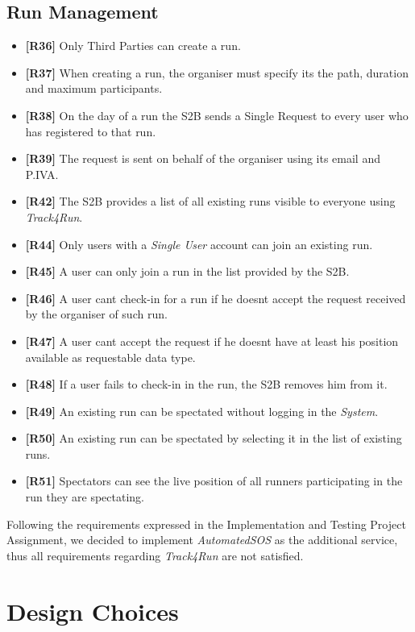 \documentclass[titlepage]{article}
\begin{document}
	\subsection{Run Management}
	\begin{itemize}
		\item {\bf [R36]} Only Third Parties can create a run.
		\item {\bf [R37]} When creating a run, the organiser must specify its the path, duration and maximum participants.
		\item {\bf [R38]} On the day of a run the S2B sends a Single Request to every user who has registered to that run.
		\item {\bf [R39]} The request is sent on behalf of the organiser using its email and P.IVA.
		\item {\bf [R42]} The S2B provides a list of all existing runs visible to everyone using {\it Track4Run}.
		\item {\bf [R44]} Only users with a {\it Single User} account can join an existing run.
		\item {\bf [R45]} A user can only join a run in the list provided by the S2B.
		\item {\bf [R46]} A user can\textsc{}t check-in for a run if he doesn\textsc{}t accept the request received by the organiser of such run.
		\item {\bf [R47]} A user can\textsc{}t accept the request if he doesn\textsc{}t have at least his position available as requestable data type.
		\item {\bf [R48]} If a user fails to check-in in the run, the S2B removes him from it.
		\item {\bf [R49]} An existing run can be spectated without logging in the {\it System}.
		\item {\bf [R50]} An existing run can be spectated by selecting it in the list of existing runs.
		\item {\bf [R51]} Spectators can see the live position of all runners participating in the run they are spectating.
	\end{itemize}	
	Following the requirements expressed in the Implementation and Testing Project Assignment, we decided to implement {\it AutomatedSOS} as the additional service, thus all requirements regarding {\it Track4Run} are not satisfied.
	
	\pagebreak
	\section{Design Choices}
	
\end{document}

